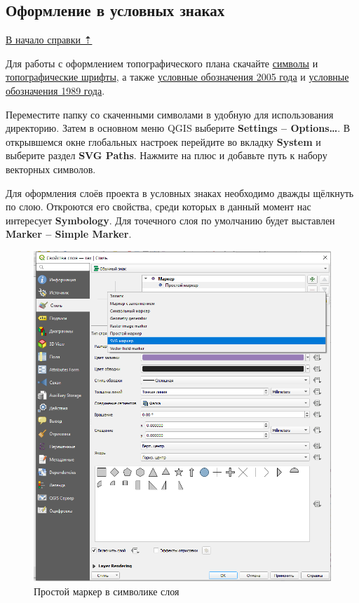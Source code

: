 \documentclass[
  12pt,
]{book}
\begin{document}
\subsection{Оформление в условных знаках}\label{practice-topo-symbols}

\hyperref[practice-topo]{В начало справки ⇡}

Для работы с оформлением топографического плана скачайте \href{https://yadi.sk/d/mb1wTvAUUAgVUQ}{символы} и \href{https://yadi.sk/d/G_3EVFLqg3C5pA}{топографические шрифты}, а также \href{https://yadi.sk/i/4EpTOHEhQdVq9g}{условные обозначения 2005 года} и \href{https://disk.yandex.ru/i/_WJi-PJUXlZi3Q}{условные обозначения 1989 года}.

Переместите папку со скаченными символами в удобную для использования директорию. Затем в основном меню QGIS выберите \textbf{Settings -- Options\ldots{}}. В открывшемся окне глобальных настроек перейдите во вкладку \textbf{System} и выберите раздел \textbf{SVG Paths}. Нажмите на плюс и добавьте путь к набору векторных символов.

Для оформления слоёв проекта в условных знаках необходимо дважды щёлкнуть по слою. Откроются его свойства, среди которых в данный момент нас интересует \textbf{Symbology}. Для точечного слоя по умолчанию будет выставлен \textbf{Marker -- Simple Marker}.

\begin{figure}
\centering
\includegraphics{images/Practice/Symbol_style_svg.png}
\caption{Простой маркер в символике слоя}
\end{figure}
\end{document}
